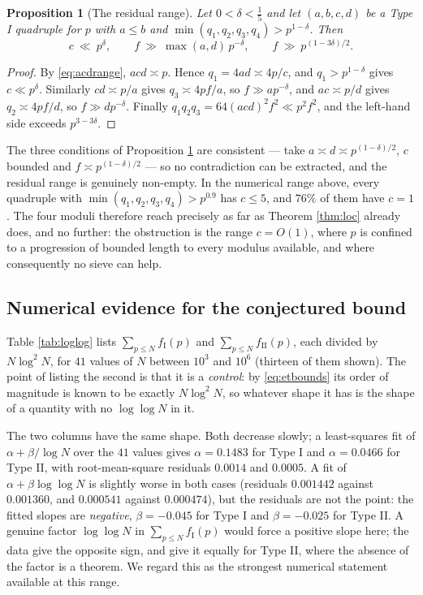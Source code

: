 \documentclass[11pt,reqno]{amsart}
\theoremstyle{plain}
\newtheorem{proposition}[theorem]{Proposition}
\theoremstyle{definition}
\numberwithin{equation}{section}
\newcommand{\fI}{f_{\mathrm{I}}}
\newcommand{\fII}{f_{\mathrm{II}}}
\begin{document}
\begin{proposition}[The residual range]\label{prop:resid}
Let $0<\delta<\tfrac15$ and let $(a,b,c,d)$ be a Type I quadruple for $p$ with $a\le b$
and $\min(q_{1},q_{2},q_{3},q_{4})>p^{1-\delta}$. Then
\[
  c\ \ll\ p^{\delta},\qquad f\ \gg\ \max(a,d)\,p^{-\delta},\qquad
  f\ \gg\ p^{(1-3\delta)/2} .
\]
\end{proposition}

\begin{proof}
By \eqref{eq:acdrange}, $acd\asymp p$. Hence $q_{1}=4ad\asymp4p/c$, and
$q_{1}>p^{1-\delta}$ gives $c\ll p^{\delta}$. Similarly $cd\asymp p/a$ gives
$q_{3}\asymp4pf/a$, so $f\gg ap^{-\delta}$, and $ac\asymp p/d$ gives
$q_{2}\asymp4pf/d$, so $f\gg dp^{-\delta}$. Finally
$q_{1}q_{2}q_{3}=64(acd)^{2}f^{2}\ll p^{2}f^{2}$, and the left-hand side exceeds
$p^{3-3\delta}$.
\end{proof}

The three conditions of Proposition \ref{prop:resid} are consistent --- take
$a\asymp d\asymp p^{(1-\delta)/2}$, $c$ bounded and $f\asymp p^{(1-\delta)/2}$ --- so no
contradiction can be extracted, and the residual range is genuinely non-empty. In the
numerical range above, every quadruple with
$\min(q_{1},q_{2},q_{3},q_{4})>p^{0.9}$ has $c\le5$, and $76\%$ of them have $c=1$.
The four moduli therefore reach precisely as far as Theorem \ref{thm:loc} already does,
and no further: the obstruction is the range $c=O(1)$, where $p$ is confined to a
progression of bounded length to every modulus available, and where consequently no
sieve can help.

\subsection{Numerical evidence for the conjectured bound}
Table \ref{tab:loglog} lists $\sum_{p\le N}\fI(p)$ and $\sum_{p\le N}\fII(p)$, each
divided by $N\log^{2}N$, for $41$ values of $N$ between $10^{3}$ and $10^{6}$
(thirteen of them shown). The point of listing the second is that it is a
\emph{control}: by \eqref{eq:etbounds} its order of magnitude is known to be exactly
$N\log^{2}N$, so whatever shape it has is the shape of a quantity with no
$\log\log N$ in it.

The two columns have the same shape. Both decrease slowly; a least-squares fit of
$\alpha+\beta/\log N$ over the $41$ values gives $\alpha=0.1483$ for Type I and
$\alpha=0.0466$ for Type II, with root-mean-square residuals $0.0014$ and $0.0005$.
A fit of $\alpha+\beta\log\log N$ is slightly worse in both cases (residuals
$0.001442$ against $0.001360$, and $0.000541$ against $0.000474$), but the residuals are
not the point: the fitted slopes are \emph{negative}, $\beta=-0.045$ for Type I and
$\beta=-0.025$ for Type II. A genuine factor $\log\log N$ in $\sum_{p\le N}\fI(p)$ would
force a positive slope here; the data give the opposite sign, and give it equally for
Type II, where the absence of the factor is a theorem. We regard this as the strongest numerical
statement available at this range.
\end{document}
